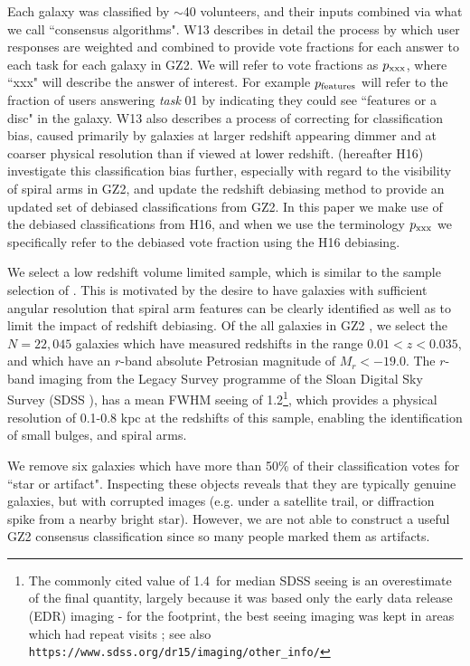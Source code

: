 \documentclass[usenatbib]{mn2e}
\begin{document}
Each galaxy was classified by $\sim$40 volunteers, and their inputs combined via what we call ``consensus algorithms". W13 describes in detail the process by which user responses are weighted and combined to provide vote fractions for each answer to each task for each galaxy in GZ2. We will refer to vote fractions as $p_{\rm xxx}$, where ``xxx" will describe the answer of interest. For example $p_{\rm features}$ will refer to the fraction of users answering {\it task} 01 by indicating they could see ``features or a disc" in the galaxy. W13 also describes a process of correcting for classification bias, caused primarily by galaxies at larger redshift appearing dimmer and at coarser physical resolution than if viewed at lower redshift. \citet{Hart2016} (hereafter H16) investigate this classification bias further, especially with regard to the visibility of spiral arms in GZ2, and update the redshift debiasing method to provide an updated set of debiased classifications from GZ2. In this paper we make use of the debiased classifications from H16, and when we use the terminology $p_{\rm xxx}$ we specifically refer to the debiased vote fraction using the H16 debiasing.

We select a low redshift volume limited sample, which is similar to the sample selection of \citet{Hart2016, Hart2017}. This is motivated by the desire to have galaxies with sufficient angular resolution that spiral arm features can be clearly identified as well as to limit the impact of redshift debiasing.  Of the all galaxies in GZ2 \citep{DR7,Strauss2002}, we select the $N=22,045$  galaxies which have measured redshifts in the range $0.01<z<0.035$, and which have an $r$-band absolute Petrosian magnitude of $M_r < -19.0$. The $r$-band imaging from the Legacy Survey programme of the Sloan Digital Sky Survey (SDSS \citealt{York2000}), has a mean FWHM seeing of 1.2\arcsec \citep{Kruk2018}\footnote{The commonly cited value of 1.4\arcsec ~for median SDSS seeing is an overestimate of the final quantity, largely because it was based only the early data release (EDR) imaging -  for the 
 footprint, the best seeing imaging was kept in areas which had repeat visits \citep{Ross2011}; see also {\tt https://www.sdss.org/dr15/imaging/other\_info/}}, which provides a physical resolution of 0.1-0.8 kpc at the redshifts of this sample, enabling the identification of small bulges, and spiral arms. 

 We remove {six} galaxies which have more than 50\% of their classification votes for ``star or artifact". Inspecting these objects reveals that they are typically genuine galaxies, but with corrupted images (e.g. under a satellite trail, or diffraction spike from a nearby bright star). However, we are not able to construct a useful GZ2 consensus classification since so many people marked them as artifacts.
\end{document}
